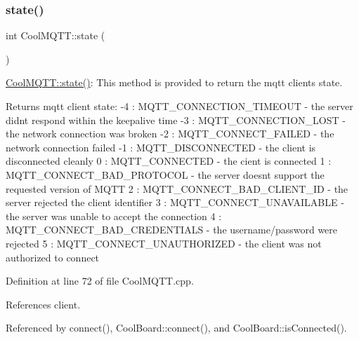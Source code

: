 \subsubsection{\texorpdfstring{state()}{state()}}
{\footnotesize\ttfamily int Cool\+M\+Q\+T\+T\+::state (\begin{DoxyParamCaption}{ }\end{DoxyParamCaption})}

\hyperlink{classCoolMQTT_a5d003307eff78efbd585e42b43b72b6d}{Cool\+M\+Q\+T\+T\+::state()}\+: This method is provided to return the mqtt client\textquotesingle{}s state. \begin{DoxyReturn}{Returns}
mqtt client state\+: -\/4 \+: M\+Q\+T\+T\+\_\+\+C\+O\+N\+N\+E\+C\+T\+I\+O\+N\+\_\+\+T\+I\+M\+E\+O\+UT -\/ the server didn\textquotesingle{}t respond within the keepalive time -\/3 \+: M\+Q\+T\+T\+\_\+\+C\+O\+N\+N\+E\+C\+T\+I\+O\+N\+\_\+\+L\+O\+ST -\/ the network connection was broken -\/2 \+: M\+Q\+T\+T\+\_\+\+C\+O\+N\+N\+E\+C\+T\+\_\+\+F\+A\+I\+L\+ED -\/ the network connection failed -\/1 \+: M\+Q\+T\+T\+\_\+\+D\+I\+S\+C\+O\+N\+N\+E\+C\+T\+ED -\/ the client is disconnected cleanly 0 \+: M\+Q\+T\+T\+\_\+\+C\+O\+N\+N\+E\+C\+T\+ED -\/ the cient is connected 1 \+: M\+Q\+T\+T\+\_\+\+C\+O\+N\+N\+E\+C\+T\+\_\+\+B\+A\+D\+\_\+\+P\+R\+O\+T\+O\+C\+OL -\/ the server doesn\textquotesingle{}t support the requested version of M\+Q\+TT 2 \+: M\+Q\+T\+T\+\_\+\+C\+O\+N\+N\+E\+C\+T\+\_\+\+B\+A\+D\+\_\+\+C\+L\+I\+E\+N\+T\+\_\+\+ID -\/ the server rejected the client identifier 3 \+: M\+Q\+T\+T\+\_\+\+C\+O\+N\+N\+E\+C\+T\+\_\+\+U\+N\+A\+V\+A\+I\+L\+A\+B\+LE -\/ the server was unable to accept the connection 4 \+: M\+Q\+T\+T\+\_\+\+C\+O\+N\+N\+E\+C\+T\+\_\+\+B\+A\+D\+\_\+\+C\+R\+E\+D\+E\+N\+T\+I\+A\+LS -\/ the username/password were rejected 5 \+: M\+Q\+T\+T\+\_\+\+C\+O\+N\+N\+E\+C\+T\+\_\+\+U\+N\+A\+U\+T\+H\+O\+R\+I\+Z\+ED -\/ the client was not authorized to connect 
\end{DoxyReturn}


Definition at line 72 of file Cool\+M\+Q\+T\+T.\+cpp.



References client.



Referenced by connect(), Cool\+Board\+::connect(), and Cool\+Board\+::is\+Connected().


